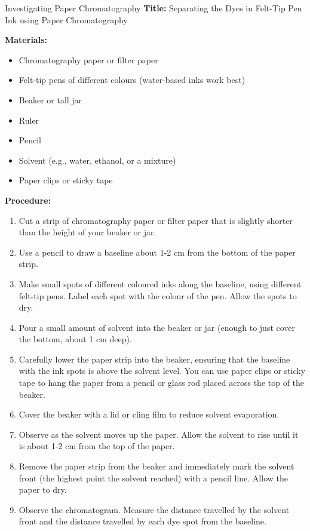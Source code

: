 \begin{investigation}{Investigating Paper Chromatography}
\textbf{Title:} Separating the Dyes in Felt-Tip Pen Ink using Paper Chromatography

\textbf{Materials:}
\begin{itemize}
    \item Chromatography paper or filter paper
    \item Felt-tip pens of different colours (water-based inks work best)
    \item Beaker or tall jar
    \item Ruler
    \item Pencil
    \item Solvent (e.g., water, ethanol, or a mixture)
    \item Paper clips or sticky tape
\end{itemize}

\textbf{Procedure:}
\begin{enumerate}
    \item Cut a strip of chromatography paper or filter paper that is slightly shorter than the height of your beaker or jar.
    \item Use a pencil to draw a baseline about 1-2 cm from the bottom of the paper strip.
    \item Make small spots of different coloured inks along the baseline, using different felt-tip pens. Label each spot with the colour of the pen. Allow the spots to dry.
    \item Pour a small amount of solvent into the beaker or jar (enough to just cover the bottom, about 1 cm deep).
    \item Carefully lower the paper strip into the beaker, ensuring that the baseline with the ink spots is above the solvent level. You can use paper clips or sticky tape to hang the paper from a pencil or glass rod placed across the top of the beaker.
    \item Cover the beaker with a lid or cling film to reduce solvent evaporation.
    \item Observe as the solvent moves up the paper. Allow the solvent to rise until it is about 1-2 cm from the top of the paper.
    \item Remove the paper strip from the beaker and immediately mark the solvent front (the highest point the solvent reached) with a pencil line. Allow the paper to dry.
    \item Observe the chromatogram. Measure the distance travelled by the solvent front and the distance travelled by each dye spot from the baseline.
\end{enumerate}


\end{investigation}
